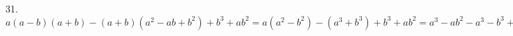31. $a(a-b)(a+b)-(a+b)(a^2-ab+b^2)+b^3+ab^2=a(a^2-b^2)-(a^3+b^3)+b^3+ab^2=a^3-ab^2-a^3-b^3+b^3+ab^2=0.$\\
